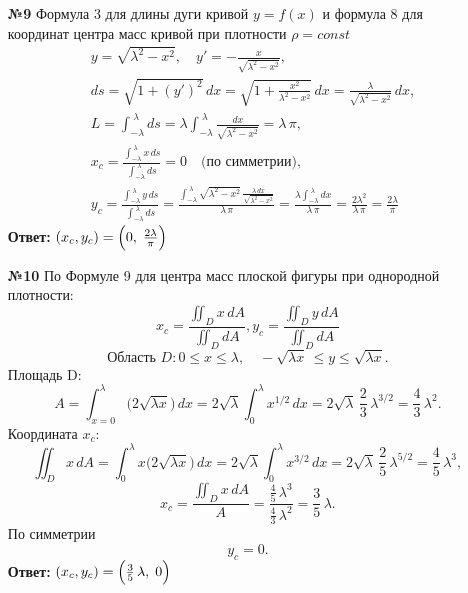 \documentclass[a4paper]{article}
\begin{document}
\begin{enumerate}
  \item[\textbf{№9}]Формула 3 для длины дуги кривой $y = f(x)$ и формула 8 для координат центра масс кривой при плотности $\rho=const $
  \[
  \begin{aligned}
  &y = \sqrt{\lambda^2 - x^2}, 
  \quad y' = -\frac{x}{\sqrt{\lambda^2 - x^2}}, 
  \\
  &ds = \sqrt{1 + (y')^2}\,dx
      = \sqrt{1 + \frac{x^2}{\lambda^2 - x^2}}\,dx
      = \frac{\lambda}{\sqrt{\lambda^2 - x^2}}\,dx,
  \\
  &L = \int_{-\lambda}^{\;\lambda} ds
      = \lambda \int_{-\lambda}^{\;\lambda} \frac{dx}{\sqrt{\lambda^2 - x^2}}
      = \lambda \,\pi,
  \\
  &x_c = \frac{\displaystyle\int_{-\lambda}^{\;\lambda} x\,ds}{\displaystyle\int_{-\lambda}^{\;\lambda} ds}
        = 0 \quad\text{(по симметрии)}, 
  \\
  &y_c = \frac{\displaystyle\int_{-\lambda}^{\;\lambda} y\,ds}{\displaystyle\int_{-\lambda}^{\;\lambda} ds}
        = \frac{\displaystyle\int_{-\lambda}^{\;\lambda} \sqrt{\lambda^2 - x^2}\,\frac{\lambda\,dx}{\sqrt{\lambda^2 - x^2}}}
              {\lambda\,\pi}
        = \frac{\displaystyle\lambda\int_{-\lambda}^{\;\lambda} dx}{\lambda\,\pi}
        = \frac{2\lambda^2}{\lambda\,\pi}
        = \frac{2\lambda}{\pi}
  \end{aligned}
  \]
  \textbf{Ответ: } $(x_c, y_c) = \Bigl(0,\;\frac{2\lambda}{\pi}\Bigr)$\\

  \item[\textbf{№10}]По Формуле 9 для центра масс плоской фигуры при однородной плотности:
  $$x_c = \frac{\iint_D x\,dA}{\iint_D dA},   y_c = \frac{\iint_D y\,dA}{\iint_D dA}$$
  \[
  \text{Область }D: 0 \le x \le \lambda,\quad -\sqrt{\lambda x}\,\le y \le \sqrt{\lambda x}.
  \]
  Площадь D:
  \[
  A = \int_{x=0}^{\lambda}\bigl(2\sqrt{\lambda x}\bigr)\,dx
      = 2\sqrt{\lambda}\int_{0}^{\lambda} x^{1/2}\,dx
      = 2\sqrt{\lambda}\,\frac{2}{3}\,\lambda^{3/2}
      = \frac{4}{3}\,\lambda^2.
  \]
  Координата $x_c$:
  \[
  \iint_D x\,dA
  = \int_{0}^{\lambda} x\bigl(2\sqrt{\lambda x}\bigr)\,dx
  = 2\sqrt{\lambda}\int_{0}^{\lambda} x^{3/2}\,dx
  = 2\sqrt{\lambda}\,\frac{2}{5}\,\lambda^{5/2}
  = \frac{4}{5}\,\lambda^3,
  \]
  \[
  x_c
  = \frac{\displaystyle\iint_D x\,dA}{\displaystyle A}
  = \frac{\tfrac{4}{5}\,\lambda^3}{\tfrac{4}{3}\,\lambda^2}
  = \frac{3}{5}\,\lambda.
  \]
  По симметрии
  \[
  y_c = 0.
  \]
  \textbf{Ответ: } $(x_c, y_c) = \Bigl(\tfrac{3}{5}\,\lambda,\;0\Bigr)$\\


\end{enumerate}
\end{document}
